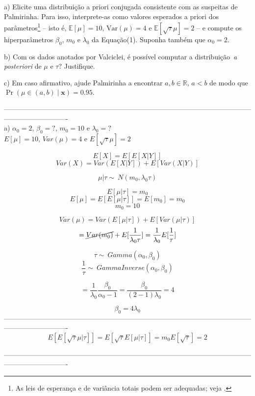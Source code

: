 \documentclass{article}
\begin{document}
			a) Elicite uma distribuição a priori conjugada consistente com as suspeitas de Palmirinha. Para isso, interprete-as como valores esperados a priori dos parâmetros\footnote{As leis de esperança e de variância totais podem ser adequadas; veja \cite[Seção 9.6]{Blitzstein2019-qi}.}  -- isto é, $\mathbb{E}[\mu] = 10$, $\mathrm{Var}(\mu) = 4$ e $\mathbb{E}[\sqrt{\tau} \mu] = 2$ -- e compute os hiperparâmetros $\beta_{0}$, $m_{0}$ e $\lambda_{0}$ da Equação(1). Suponha também que $\alpha_{0} = 2$.
			
			b) Com os dados anotados por Valciclei, é possível computar a distribuição~\textit{a posteriori} de $\mu$ e $\tau$? Justifique.
			 
			c) Em caso afirmativo, ajude Palmirinha a encontrar $a, b \in \mathbb{R}$, $a < b$ de modo que $\operatorname{Pr}(\mu \in (a, b) \mid \boldsymbol{x}) = 0.95$.
		
		----------------------------------------------------------------------------------------------------------------------------------------\\
		a) $\alpha_0 = 2$, $\beta_0 = ?$, $m_0 = 10$ e $\lambda_0 = ?$\\
		$E[\mu] = 10$, $Var(\mu) = 4$ e $E[\sqrt{\tau}\mu] = 2$
		
		$$E[X] = E[E[X|Y]]$$
		$$Var(X) = Var(E[X|Y]) + E[Var(X|Y)]$$
		
		$$\mu | \tau \sim\ N(m_0, \lambda_0 \tau)$$
		
		$$E[\mu | \tau] = m_0$$		
		$$E[\mu] = E[E[\mu | \tau]] = E[m_0] = m_0$$
		$$m_0 = 10$$
		
		$$Var(\mu) = Var(E[\mu|\tau]) + E[Var(\mu | \tau)]$$
		$$= \cancel{Var(m_0)} + E[\frac{1}{\lambda_0 \tau}] = \frac{1}{\lambda_0} E[\frac{1}{\tau}]$$
		
		$$\tau \sim\ Gamma(\alpha_0, \beta_0)$$
		$$\frac{1}{\tau} \sim\ GammaInverse(\alpha_0, \beta_0)$$
		
		$$= \frac{1}{\lambda_0} \frac{\beta_0}{\alpha_0 - 1} = \frac{\beta_0}{(2-1)\lambda_0} = 4$$
		
		$$\beta_0 = 4 \lambda_0$$
		----------------------------------------------------------------------------------------------------------------------------------------\\
		$$E[E[\sqrt{\tau}\mu | \tau]] = E[\sqrt{\tau} E[\mu | \tau]] = m_0 E[\sqrt{\tau}] = 2$$
		
		----------------------------------------------------------------------------------------------------------------------------------------\\
		
\end{document}
